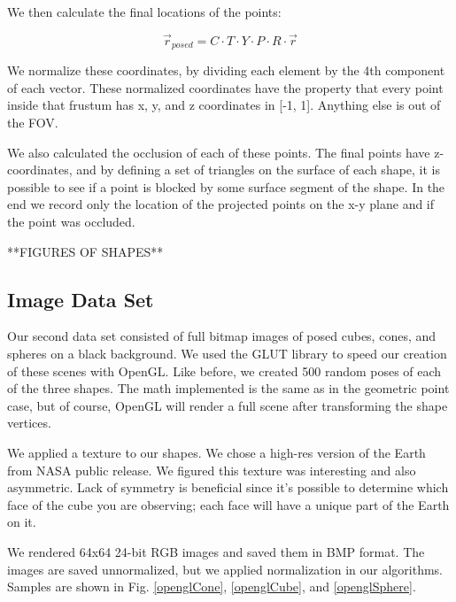 \documentclass[journal]{IEEEtran}
\begin{document}
We then calculate the final locations of the points:

\begin{equation}
\vec r_{posed} = C \cdot T \cdot Y \cdot P \cdot R \cdot \vec r
\end{equation}

We normalize these coordinates, by dividing each element by the 4th component of each vector. These normalized coordinates have the property that every point inside that frustum has x, y, and z coordinates in [-1, 1]. Anything else is out of the FOV.

We also calculated the occlusion of each of these points. The final points have z-coordinates, and by defining a set of triangles on the surface of each shape, it is possible to see if a point is blocked by some surface segment of the shape. In the end we record only the location of the projected points on the x-y plane and if the point was occluded.

**FIGURES OF SHAPES**

\subsection{Image Data Set}
Our second data set consisted of full bitmap images of posed cubes, cones, and spheres on a black background. We used the GLUT library to speed our creation of these scenes with OpenGL. Like before, we created 500 random poses of each of the three shapes. The math implemented is the same as in the geometric point case, but of course, OpenGL will render a full scene after transforming the shape vertices.

We applied a texture to our shapes. We chose a high-res version of the Earth from NASA public release. We figured this texture was interesting and also asymmetric. Lack of symmetry is beneficial since it's possible to determine which face of the cube you are observing; each face will have a unique part of the Earth on it.

We rendered 64x64 24-bit RGB images and saved them in BMP format. The images are saved unnormalized, but we applied normalization in our algorithms.
Samples are shown in Fig. \ref{openglCone}, \ref{openglCube}, and \ref{openglSphere}.
\end{document}
